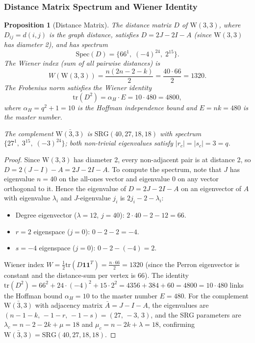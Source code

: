 \documentclass[12pt,a4paper]{article}
\newtheorem{proposition}[theorem]{Proposition}
\newcommand{\W}{\mathrm{W}(3,3)}
\begin{document}
\subsubsection{Distance Matrix Spectrum and Wiener Identity}

\begin{proposition}[Distance Matrix]\label{prop:distancematrix}
The distance matrix $D$ of $\W$, where $D_{ij}=d(i,j)$ is the graph distance,
satisfies $D = 2J - 2I - A$ (since $\W$ has diameter 2), and has spectrum
\[
  \mathrm{Spec}(D) = \{66^1,\;(-4)^{24},\;2^{15}\}.
\]
The Wiener index (sum of all pairwise distances) is
\[
  W(\W) = \frac{n(2n-2-k)}{2} = \frac{40\cdot 66}{2} = 1320.
\]
The Frobenius norm satisfies the Wiener identity
\[
  \mathrm{tr}(D^2) = \alpha_H\cdot E = 10\cdot 480 = 4800,
\]
where $\alpha_H = q^2+1 = 10$ is the Hoffman independence bound and $E = nk = 480$
is the master number.

The complement $\bar{\W}$ is $\mathrm{SRG}(40,27,18,18)$ with spectrum
$\{27^1,\; 3^{15},\; (-3)^{24}\}$; both non-trivial eigenvalues satisfy
$|r_c| = |s_c| = 3 = q$.
\end{proposition}

\begin{proof}
Since $\W$ has diameter 2, every non-adjacent pair is at distance 2, so
$D = 2(J - I) - A = 2J - 2I - A$.  To compute the spectrum, note that
$J$ has eigenvalue $n=40$ on the all-ones vector and eigenvalue $0$ on any
vector orthogonal to it.  Hence the eigenvalue of $D = 2J - 2I - A$ on an
eigenvector of $A$ with eigenvalue $\lambda_i$ and $J$-eigenvalue $j_i$ is
$2j_i - 2 - \lambda_i$:
\begin{itemize}
  \item Degree eigenvector ($\lambda=12$, $j=40$): $2\cdot 40 - 2 - 12 = 66$.
  \item $r=2$ eigenspace ($j=0$): $0 - 2 - 2 = -4$.
  \item $s=-4$ eigenspace ($j=0$): $0 - 2 - (-4) = 2$.
\end{itemize}
Wiener index $W = \tfrac{1}{2}\mathrm{tr}(D\mathbf{1}\mathbf{1}^T) = \tfrac{n\cdot 66}{2} = 1320$
(since the Perron eigenvector is constant and the distance-sum per vertex is $66$).
The identity $\mathrm{tr}(D^2) = 66^2 + 24\cdot(-4)^2 + 15\cdot 2^2 = 4356 + 384 + 60 = 4800 = 10\cdot 480$
links the Hoffman bound $\alpha_H = 10$ to the master number $E = 480$.
For the complement $\bar{\W}$ with adjacency matrix $\bar{A} = J - I - A$, the eigenvalues
are $(n-1-k,\,-1-r,\,-1-s) = (27,\,-3,\,3)$, and the SRG parameters are
$\lambda_c = n-2-2k+\mu = 18$ and $\mu_c = n-2k+\lambda = 18$, confirming
$\bar{\W} = \mathrm{SRG}(40,27,18,18)$.
\end{proof}
\end{document}
